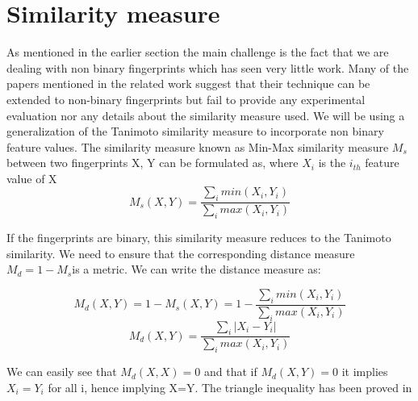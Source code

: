 \section{Similarity measure}

As mentioned in the earlier section the main challenge is the fact that we are dealing with non binary fingerprints which has seen very little work. Many of the papers mentioned in the related work suggest that their technique can be extended to non-binary fingerprints but fail to provide any experimental evaluation nor any details about the similarity measure used. We will be using a generalization of the Tanimoto similarity measure to incorporate non binary feature values. The similarity measure known as Min-Max similarity measure $M_s$ between two fingerprints X, Y can be formulated as, where $X_i$ is the $i_{th}$ feature value of X \[ M_s(X,Y) = \frac{\sum \limits_{i} min(X_i, Y_i)}{\sum \limits_{i} max(X_i, Y_i)}\]

If the fingerprints are binary, this similarity measure reduces to the Tanimoto similarity. We need to ensure that the corresponding distance measure $M_d=1- M_s$is a metric. We can write the distance measure as: 

\[ M_d(X,Y) = 1- M_s(X,Y) = 1- \frac{\sum \limits_{i} min(X_i, Y_i)}{\sum \limits_{i} max(X_i, Y_i)}\]
\[ M_d(X,Y)= \frac{\sum \limits_{i} |X_i - Y_i|}{\sum \limits_{i} max(X_i, Y_i)}\]

We can easily see that $M_d(X,X)=0$ and that if $M_d(X,Y)=0 $ it implies $X_i = Y_i$ for all i, hence implying X=Y. The triangle inequality has been proved in \citet*{lipkus1999proof}\\




